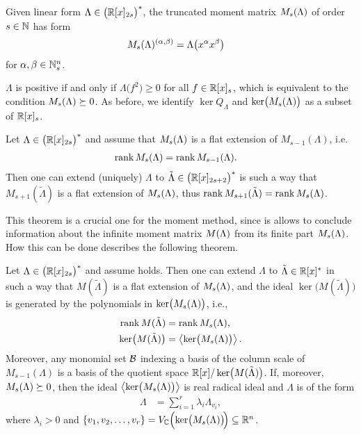 \begin{definition}
  Given linear form $\Lambda\in\big(\mathbb{R}[x]_{2s}\big)^*$, the truncated moment matrix $M_s(\Lambda)$ of order $s\in\mathbb{N}$ has form
  \begin{align}
    M_s(\Lambda)^{(\alpha, \beta)} &= \Lambda\big(x^\alpha x^\beta\big)
  \end{align}
  for $\alpha, \beta \in\mathbb{N}_s^n$.
\end{definition}

$\Lambda$ is positive if and only if $\Lambda\big(f^2\big)\geq0$ for all $f\in\mathbb{R}[x]_s$, which is equivalent to the condition $M_s(\Lambda)\succeq0$.
As before, we identify $\ker Q_\Lambda$ and $\operatorname{ker}\!\big(M_s(\Lambda)\big)$ as a subset of $\mathbb{R}[x]_s$.

\begin{theorem}
  Let $\Lambda\in\big(\mathbb{R}[x]_{2s}\big)^*$ and assume that $M_s(\Lambda)$ is a flat extension of $M_{s-1}(\Lambda)$, i.e.
  \begin{align}
    \rank\MLs &= \rank M_{s-1}(\Lambda).\labeleq{POP:sol:flat}
  \end{align}
  Then one can extend (uniquely) $\Lambda$ to $\tilde{\Lambda}\in\big(\mathbb{R}[x]_{2s+2}\big)^*$ is such a way that $M_{s+1}(\tilde{\Lambda})$ is a flat extension of $M_s(\Lambda)$, thus $\operatorname{rank} M_{s+1}(\tilde{\Lambda})=\operatorname{rank}M_s(\Lambda)$.
\end{theorem}

This theorem is a crucial one for the moment method, since is allows to conclude information about the infinite moment matrix $M(\Lambda)$ from its finite part $M_s(\Lambda)$.
How this can be done describes the following theorem.

\begin{theorem}
  Let $\Lambda\in\big(\mathbb{R}[x]_{2s}\big)^*$ and assume  holds.
  Then one can extend $\Lambda$ to $\tilde{\Lambda}\in\mathbb{R}[x]^*$ in such a way that $M(\tilde{\Lambda})$ is a flat extension of $M_s(\Lambda)$, and the ideal $\ker\!\big(M(\tilde{\Lambda})\big)$ is generated by the polynomials in $\operatorname{ker}\!\big(M_s(\Lambda)\big)$, i.e.,
  \begin{align}
    \operatorname{rank} M(\tilde{\Lambda}) &= \operatorname{rank} M_s(\Lambda),\\
    \operatorname{ker}\!\big(M(\tilde{\Lambda})\big) &= \left<\operatorname{ker}\!\big(M_s(\Lambda)\big) \right> .
  \end{align}
  Moreover, any monomial set $\mathcal{B}$ indexing a basis of the column scale of $M_{s-1}(\Lambda)$ is a basis of the quotient space $\mathbb{R}[x]/\operatorname{ker}\!\big(M(\tilde{\Lambda})\big)$. If, moreover, $M_s(\Lambda) \succeq 0$, then the ideal $\left<\operatorname{ker}\!\big(M_s(\Lambda)\big) \right>$ is real radical ideal and $\Lambda$ is of the form
  \begin{align}
    \Lambda &= \sum_{i=1}^r \lambda_i \Lambda_{v_i},
  \end{align}
  where $\lambda_i>0$ and $\{v_1, v_2, \ldots, v_r\}=V_{\mathbb{C}}\Big(\!\operatorname{ker}\!\big(M_s(\Lambda)\big)\!\Big)\subseteq\mathbb{R}^n$.
\end{theorem}

